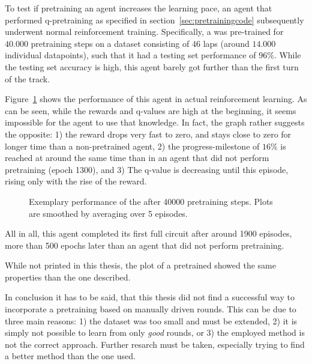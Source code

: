 To test if pretraining an agent increases the learning pace, an agent that performed q-pretraining as specified in section~\ref{sec:pretrainingcode} subsequently underwent normal reinforcement training. Specifically, a  was pre-trained for $40.000$ pretraining steps on a dataset consisting of $46$ laps (around $14.000$ individual datapoints), such that it had a testing set performance of $96\%$. While the testing set accuracy is high, this agent barely got further than the first turn of the track.

Figure~\ref{fig:ddpg_incorpPre} shows the performance of this agent in actual reinforcement learning. As can be seen, while the rewards and q-values are high at the beginning, it seems impossible for the agent to use that knowledge. In fact, the graph rather suggests the opposite: 1) the reward drops very fast to zero, and stays close to zero for longer time than a non-pretrained agent, 2) the progress-milestone of $16\%$ is reached at around the same time than in an agent that did not perform pretraining (epoch 1300), and 3) The q-value is decreasing until this episode, rising only with the rise of the reward.

\begin{figure}[h]
	{%
		\setlength{\fboxsep}{0pt}%
		\setlength{\fboxrule}{1pt}%
	}%
	\centering
	\caption[Exemplary performance of the  after 40000 pretrain steps]{Exemplary performance of the  after 40000 pretraining steps. Plots are smoothed by averaging over 5 episodes.}
	\label{fig:ddpg_incorpPre}
\end{figure}

All in all, this agent completed its first full circuit after around 1900 episodes, more than 500 epochs later than an agent that did not perform pretraining. 

While not printed in this thesis, the plot of a pretrained  showed the same properties than the one described.

In conclusion it has to be said, that this thesis did not find a successful way to incorporate a pretraining based on manually driven rounds. This can be due to three main reasons: 1) the dataset was too small and must be extended, 2) it is simply not possible to learn from only \textit{good} rounds, or 3) the employed method is not the correct approach. Further resarch must be taken, especially trying to find a better method than the one used.


